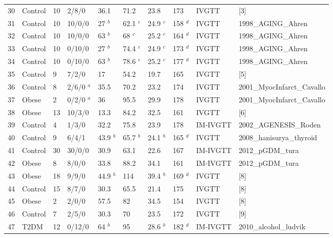 \documentclass[utf8]{frontiersSCNS} %
\begin{document}
\begin{table}[h]
{\begin{tabular}{llllllllll}
30 & Control & 10 & 2/8/0   & 36.1   & 71.2    & 23.8   & 173   & IVGTT    & [3]                      \\
31 & Control & 10 & 10/0/0  & 27 $^b$   & 62.1 $^c$ & 24.9 $^c$ & 158 $^d$ & IVGTT    & 1998_AGING_Ahren         \\
32 & Control & 10 & 10/0/0  & 63 $^b$   & 68 $^c$   & 25.2 $^c$ & 164 $^d$ & IVGTT    & 1998_AGING_Ahren         \\
33 & Control & 10 & 0/10/0  & 27 $^b$   & 74.4 $^c$ & 24.9 $^c$ & 173 $^d$ & IVGTT    & 1998_AGING_Ahren         \\
34 & Control & 10 & 0/10/0  & 63 $^b$   & 78.6 $^c$ & 25.2 $^c$ & 177 $^d$ & IVGTT    & 1998_AGING_Ahren         \\
35 & Control & 9  & 7/2/0   & 17     & 54.2    & 19.7   & 165   & IVGTT    & [5]                      \\
36 & Control & 8  & 2/6/0 $^a$ & 35.5   & 70.2    & 23.2   & 174   & IVGTT    & 2001_MyocInfarct_Cavallo \\
37 & Obese   & 2  & 0/2/0 $^a$ & 36     & 95.5    & 29.9   & 178   & IVGTT    & 2001_MyocInfarct_Cavallo \\
38 & Obese   & 13 & 10/3/0  & 13.3   & 84.2    & 32.5   & 161   & IVGTT    & [6]                      \\
39 & Control & 4  & 1/3/0   & 32.2   & 75.8    & 23.9   & 178   & IM-IVGTT & 2002_AGENESIS_Roden      \\
40 &
  Control &
  9 &
  6/4/1 &
  43.9 $^b$ &
  65.7 $^b$ &
  24.1 $^b$ &
  165 $^d$ &
  IVGTT &
  2008_hanisurya_thyroid \\
41 & Control & 30 & 30/0/0  & 30.9   & 63.1    & 22.6   & 167   & IM-IVGTT & 2012_pGDM_tura           \\
42 & Obese   & 8  & 8/0/0   & 33.8   & 88.2    & 34.1   & 161   & IM-IVGTT & 2012_pGDM_tura           \\
43 & Obese   & 18 & 9/9/0   & 44.9 $^b$ & 114     & 39.4 $^b$ & 169 $^d$ & IVGTT    & [8]                      \\
44 & Control & 15 & 8/7/0   & 30.3   & 65.5    & 21.4   & 175   & IVGTT    & [8]                      \\
45 & Obese   & 2  & 2/0/0   & 57.5   & 82      & 34.5   & 154   & IVGTT    & [8]                      \\
46 & Control & 7  & 2/5/0   & 30.3   & 70      & 23.5   & 172   & IVGTT    & [9]                      \\
47 & T2DM    & 12 & 0/12/0  & 64 $^b$   & 95      & 28.6 $^b$ & 182 $^d$ & IM-IVGTT & 2010_alcohol_ludvik      \\

\end{tabular}}
\end{table}
\end{document}
